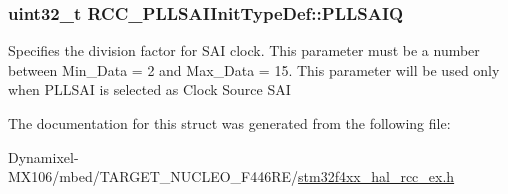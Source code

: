 \subsubsection[{\texorpdfstring{P\+L\+L\+S\+A\+IQ}{PLLSAIQ}}]{\setlength{\rightskip}{0pt plus 5cm}uint32\+\_\+t R\+C\+C\+\_\+\+P\+L\+L\+S\+A\+I\+Init\+Type\+Def\+::\+P\+L\+L\+S\+A\+IQ}\hypertarget{struct_r_c_c___p_l_l_s_a_i_init_type_def_addd252bc81b5eb646803cf3e0941499c}{}\label{struct_r_c_c___p_l_l_s_a_i_init_type_def_addd252bc81b5eb646803cf3e0941499c}
Specifies the division factor for S\+AI clock. This parameter must be a number between Min\+\_\+\+Data = 2 and Max\+\_\+\+Data = 15. This parameter will be used only when P\+L\+L\+S\+AI is selected as Clock Source S\+AI 

The documentation for this struct was generated from the following file\+:\begin{DoxyCompactItemize}
\item 
Dynamixel-\/\+M\+X106/mbed/\+T\+A\+R\+G\+E\+T\+\_\+\+N\+U\+C\+L\+E\+O\+\_\+\+F446\+R\+E/\hyperlink{stm32f4xx__hal__rcc__ex_8h}{stm32f4xx\+\_\+hal\+\_\+rcc\+\_\+ex.\+h}\end{DoxyCompactItemize}
